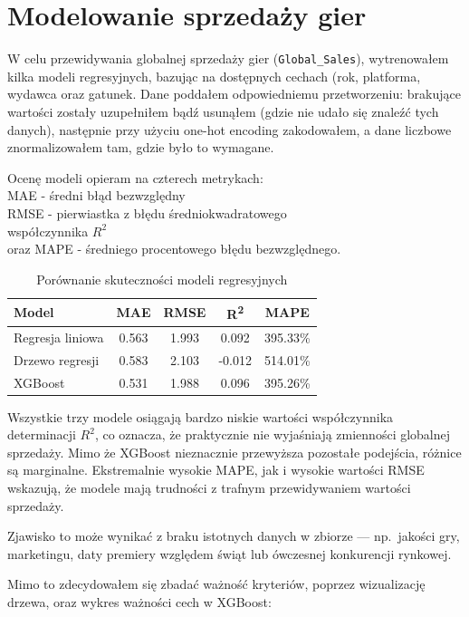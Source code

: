 \documentclass[11pt]{article}
\begin{document}
\section{Modelowanie sprzedaży gier}\label{sec:modelowanie-sprzedazy-gier}

W celu przewidywania globalnej sprzedaży gier (\texttt{Global\_Sales}),
wytrenowałem kilka modeli regresyjnych, bazując na dostępnych cechach (rok, platforma, wydawca oraz gatunek.
Dane poddałem odpowiedniemu przetworzeniu: brakujące wartości zostały uzupełniłem bądź usunąłem (gdzie nie udało się znaleźć tych danych),
następnie przy użyciu one-hot encoding zakodowałem, a dane liczbowe znormalizowałem tam, gdzie było to wymagane.

Ocenę modeli opieram na czterech metrykach:\\
MAE - średni błąd bezwzględny\\
RMSE - pierwiastka z błędu średniokwadratowego\\
współczynnika \( R^2 \)\\
oraz MAPE - średniego procentowego błędu bezwzględnego.

\begin{table}[H]
\centering
\begin{tabular}{|l|c|c|c|c|}
\hline
\textbf{Model} & \textbf{MAE} & \textbf{RMSE} & \textbf{R\textsuperscript{2}} & \textbf{MAPE} \\
\hline
Regresja liniowa & 0.563 & 1.993 & 0.092 & 395.33\% \\
Drzewo regresji  & 0.583 & 2.103 & -0.012 & 514.01\% \\
XGBoost          & 0.531 & 1.988 & 0.096 & 395.26\% \\
\hline
\end{tabular}
\caption{Porównanie skuteczności modeli regresyjnych}
\label{tab:model_comparison}
\end{table}

Wszystkie trzy modele osiągają bardzo niskie wartości współczynnika determinacji \( R^2 \),
co oznacza, że praktycznie nie wyjaśniają zmienności globalnej sprzedaży.
Mimo że XGBoost nieznacznie przewyższa pozostałe podejścia, różnice są marginalne.
Ekstremalnie wysokie MAPE, jak i wysokie wartości RMSE wskazują,
że modele mają trudności z trafnym przewidywaniem wartości sprzedaży.

Zjawisko to może wynikać z braku istotnych danych w zbiorze — np.~jakości gry, marketingu, daty premiery względem świąt lub ówczesnej konkurencji rynkowej.

Mimo to zdecydowałem się zbadać ważność kryteriów, poprzez wizualizację drzewa, oraz wykres ważności cech w XGBoost:
\end{document}
